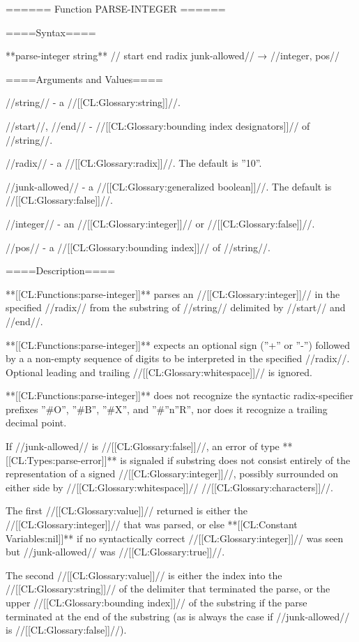 ====== Function PARSE-INTEGER ======

====Syntax====

**{parse-integer} {string** //\key} start end radix junk-allowed// → //integer, pos//

====Arguments and Values====

//string// - a //[[CL:Glossary:string]]//.

//start//, //end// - //[[CL:Glossary:bounding index designators]]// of //string//. 

//radix// - a //[[CL:Glossary:radix]]//. The default is ''10''.

//junk-allowed// - a //[[CL:Glossary:generalized boolean]]//. The default is //[[CL:Glossary:false]]//.

//integer// - an //[[CL:Glossary:integer]]// or //[[CL:Glossary:false]]//.

//pos// - a //[[CL:Glossary:bounding index]]// of //string//.

====Description====

**[[CL:Functions:parse-integer]]** parses an //[[CL:Glossary:integer]]// in the specified //radix// from the substring of //string// delimited by //start// and //end//.

**[[CL:Functions:parse-integer]]** expects an optional sign (''+'' or ''-'') followed by a a non-empty sequence of digits to be interpreted in the specified //radix//. Optional leading and trailing //[[CL:Glossary:whitespace]]// is ignored.

**[[CL:Functions:parse-integer]]** does not recognize the syntactic radix-specifier prefixes ''#O'', ''#B'', ''#X'', and ''#''n''R'', nor does it recognize a trailing decimal point.

If //junk-allowed// is //[[CL:Glossary:false]]//, an error of type **[[CL:Types:parse-error]]** is signaled if substring does not consist entirely of the representation of a signed //[[CL:Glossary:integer]]//, possibly surrounded on either side by //[[CL:Glossary:whitespace]]// //[[CL:Glossary:characters]]//.

The first //[[CL:Glossary:value]]// returned is either the //[[CL:Glossary:integer]]// that was parsed, or else **[[CL:Constant Variables:nil]]** if no syntactically correct //[[CL:Glossary:integer]]// was seen but //junk-allowed// was //[[CL:Glossary:true]]//.

The second //[[CL:Glossary:value]]// is either the index into the //[[CL:Glossary:string]]// of the delimiter that terminated the parse, or the upper //[[CL:Glossary:bounding index]]// of the substring if the parse terminated at the end of the substring (as is always the case if //junk-allowed// is //[[CL:Glossary:false]]//).

